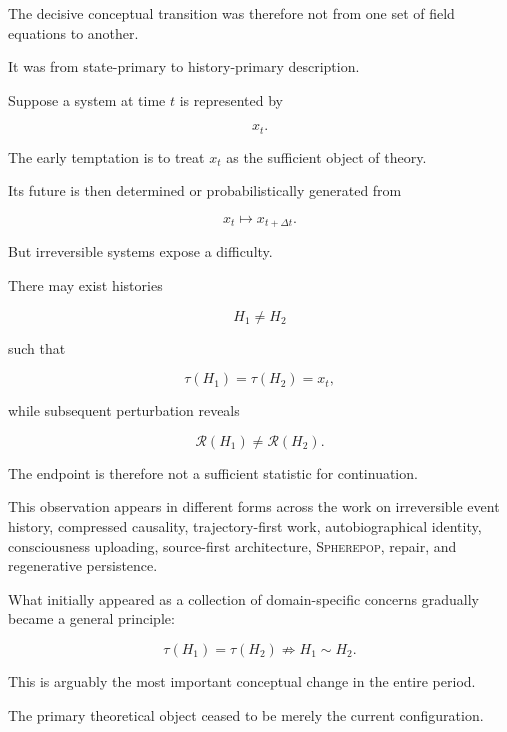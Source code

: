 \documentclass[11pt]{article}
\theoremstyle{remark}
\newcommand{\Spherepop}{\textsc{Spherepop}}
\newcommand{\Reach}{\mathcal{R}}
\begin{document}
The decisive conceptual transition was therefore not from one set of field equations to another.

It was from state-primary to history-primary description.

Suppose a system at time $t$ is represented by

\begin{equation}
x_t.
\end{equation}

The early temptation is to treat $x_t$ as the sufficient object of theory.

Its future is then determined or probabilistically generated from

\begin{equation}
x_t\mapsto x_{t+\Delta t}.
\end{equation}

But irreversible systems expose a difficulty.

There may exist histories

\begin{equation}
H_1\neq H_2
\end{equation}

such that

\begin{equation}
\tau(H_1)=\tau(H_2)=x_t,
\end{equation}

while subsequent perturbation reveals

\begin{equation}
\Reach(H_1)\neq\Reach(H_2).
\end{equation}

The endpoint is therefore not a sufficient statistic for continuation.

This observation appears in different forms across the work on irreversible event history, compressed causality, trajectory-first work, autobiographical identity, consciousness uploading, source-first architecture, \Spherepop{}, repair, and regenerative persistence.

What initially appeared as a collection of domain-specific concerns gradually became a general principle:

\begin{equation}
\boxed{
\tau(H_1)=\tau(H_2)
\not\Rightarrow
H_1\sim H_2.
}
\end{equation}

This is arguably the most important conceptual change in the entire period.

The primary theoretical object ceased to be merely the current configuration.
\end{document}
